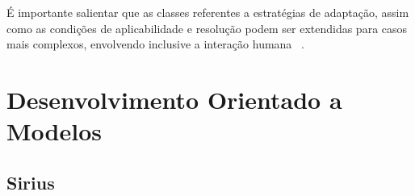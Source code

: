 É importante salientar que as classes referentes a estratégias de adaptação, assim como as condições de aplicabilidade e resolução podem ser extendidas para casos mais complexos, envolvendo inclusive a interação humana ~\cite{tesevitor}.




\section{Desenvolvimento Orientado a Modelos}

\subsection{Sirius}

